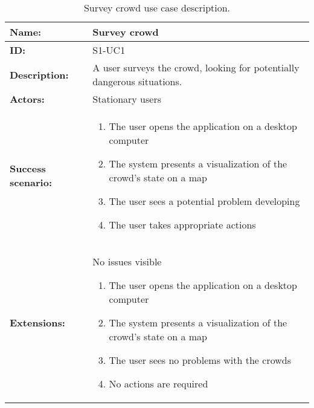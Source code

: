 \begin{table}[h!]
    \centering
    \begin{tabularx}{\textwidth}{|l|X|}
        \hline
        \textbf{Name:}  & Survey crowd \\ \hline
        \textbf{ID:}    & S1-UC1 \\ \hline
        \textbf{Description:} & A user surveys the crowd, looking for potentially dangerous situations. \\ \hline
        \textbf{Actors:} & Stationary users \\ \hline
        \textbf{Success scenario:} & 
        \begin{enumerate}
            \item The user opens the application on a desktop computer
            \item The system presents a visualization of the crowd's state on a map
            \item The user sees a potential problem developing
            \item The user takes appropriate actions
        \end{enumerate}
        \\ \hline
        \textbf{Extensions:} & No issues visible
        \begin{enumerate}
            \item The user opens the application on a desktop computer
            \item The system presents a visualization of the crowd's state on a map
            \item The user sees no problems with the crowds
            \item No actions are required
        \end{enumerate} 
        \\ \hline
    \end{tabularx}
    \caption{Survey crowd use case description.}
    \label{tab:s1-uc1}
\end{table}

